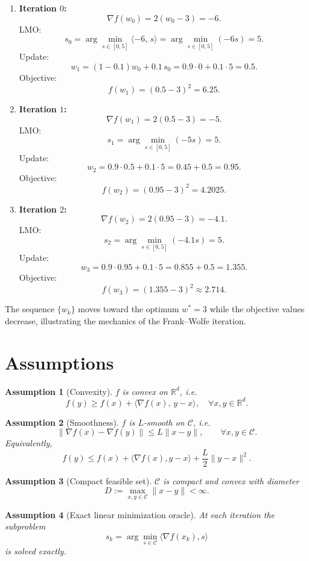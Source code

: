 \documentclass{article}
\newtheorem{assumption}{Assumption}
\newcommand{\R}{\mathbb{R}}
\begin{document}
\begin{enumerate}[label=Iteration \arabic*:, leftmargin=*]
\item \textbf{Iteration $0$:}
\[
\nabla f(w_{0})=2(w_{0}-3)=-6.
\]
LMO:
\[
s_{0}= \arg\min_{s\in[0,5]}\langle -6,\,s\rangle
      =\arg\min_{s\in[0,5]}(-6s)=5.
\]
Update:
\[
w_{1}= (1-0.1)w_{0}+0.1\,s_{0}=0.9\cdot0+0.1\cdot5=0.5.
\]
Objective:
\[
f(w_{1})=(0.5-3)^{2}=6.25.
\]

\item \textbf{Iteration $1$:}
\[
\nabla f(w_{1})=2(0.5-3)=-5.
\]
LMO:
\[
s_{1}= \arg\min_{s\in[0,5]}(-5s)=5.
\]
Update:
\[
w_{2}=0.9\cdot0.5+0.1\cdot5=0.45+0.5=0.95.
\]
Objective:
\[
f(w_{2})=(0.95-3)^{2}=4.2025.
\]

\item \textbf{Iteration $2$:}
\[
\nabla f(w_{2})=2(0.95-3)=-4.1.
\]
LMO:
\[
s_{2}= \arg\min_{s\in[0,5]}(-4.1s)=5.
\]
Update:
\[
w_{3}=0.9\cdot0.95+0.1\cdot5=0.855+0.5=1.355.
\]
Objective:
\[
f(w_{3})=(1.355-3)^{2}\approx 2.714.
\]
\end{enumerate}
The sequence $\{w_{k}\}$ moves toward the optimum $w^{*}=3$ while the
objective values decrease, illustrating the mechanics of the
Frank–Wolfe iteration.

\newpage
\section*{Assumptions}
\begin{assumption}[Convexity]\label{ass:convex}
$f$ is convex on $\R^{d}$, i.e.
\[
f(y)\ge f(x)+\langle\nabla f(x),\,y-x\rangle,\quad\forall x,y\in\R^{d}.
\]
\end{assumption}
\begin{assumption}[Smoothness]\label{ass:smooth}
$f$ is $L$‑smooth on $\mathcal C$, i.e.
\[
\|\nabla f(x)-\nabla f(y)\|\le L\|x-y\|,\qquad\forall x,y\in\mathcal C.
\]
Equivalently,
\[
f(y)\le f(x)+\langle\nabla f(x),y-x\rangle+\frac{L}{2}\|y-x\|^{2}.
\tag{1}
\]
\end{assumption}
\begin{assumption}[Compact feasible set]\label{ass:compact}
$\mathcal C$ is compact and convex with diameter
\[
D:=\max_{x,y\in\mathcal C}\|x-y\|<\infty .
\]
\end{assumption}
\begin{assumption}[Exact linear minimization oracle]\label{ass:lmo}
At each iteration the subproblem
\[
s_{k}=\arg\min_{s\in\mathcal C}\langle\nabla f(x_{k}),s\rangle
\]
is solved exactly.
\end{assumption}
\end{document}
